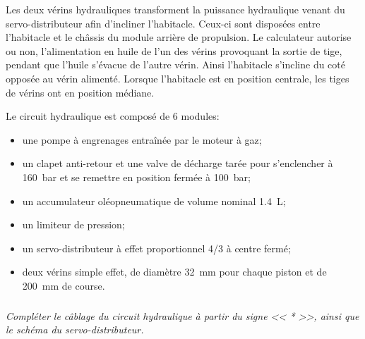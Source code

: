 \documentclass[10pt,fleqn]{article} %
\begin{document}
\begin{multicols}{2}
Les deux vérins hydrauliques transforment la puissance hydraulique venant du servo-distributeur afin d’incliner l’habitacle. Ceux-ci sont disposées entre l’habitacle et le châssis du module arrière de propulsion. Le calculateur autorise ou non, l’alimentation en huile de l’un des vérins provoquant la sortie de tige, pendant que l’huile s'évacue de l’autre vérin. Ainsi l’habitacle s'incline du coté opposée au vérin alimenté. Lorsque l’habitacle est en position centrale, les tiges de vérins ont en position médiane.


Le circuit hydraulique est composé de 6 modules:
\begin{itemize}
\item une pompe à engrenages entraînée par le moteur à gaz;
\item un clapet anti-retour et une valve de décharge tarée pour s’enclencher à \SI{160}{bar} et se remettre en position fermée à \SI{100}{bar};
\item un accumulateur oléopneumatique de volume nominal \SI{1,4}{L};
\item un limiteur de pression;
\item un servo-distributeur à effet proportionnel 4/3 à centre fermé;
\item deux vérins simple effet, de diamètre \SI{32}{mm} pour chaque piston et de \SI{200}{mm} de course.
\end{itemize}

\fi

\subparagraph{}\textit{Compléter le câblage du circuit hydraulique à partir du signe << * >>, ainsi que le schéma  du servo-distributeur.}


\end{multicols}
\end{document}
